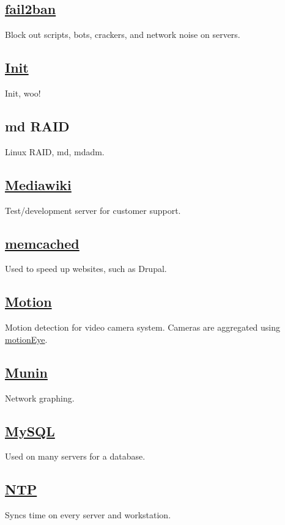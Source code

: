 \subsection{\href{http://www.fail2ban.org/}{fail2ban}}
Block out scripts, bots, crackers, and network noise on servers.

\subsection{\href{http://www.debian.org/}{Init}}
Init, woo!

\subsection{md RAID}
Linux RAID, md, mdadm.

\subsection{\href{http://www.mediawiki.org/}{Mediawiki}}
Test/development server for customer support.

\subsection{\href{http://www.memcached.org/}{memcached}}
Used to speed up websites, such as Drupal.

\subsection{\href{http://motion.sf.net}{Motion}}
Motion detection for video camera system. Cameras are aggregated
using \href{https://bitbucket.org/ccrisan/motioneye/wiki/Home}{motionEye}.

\subsection{\href{http://munin-monitoring.org/}{Munin}}
Network graphing.

\subsection{\href{http://www.mysql.org/}{MySQL}}
Used on many servers for a database.

\subsection{\href{http://support.ntp.org/}{NTP}}
Syncs time on every server and workstation.

